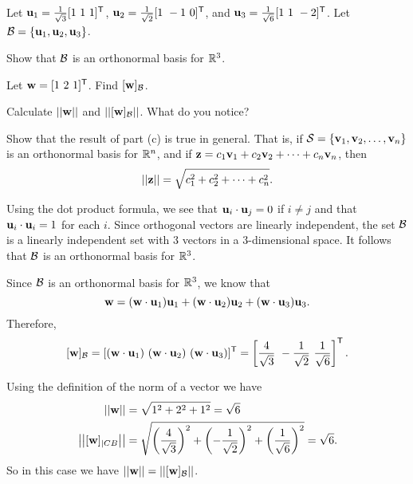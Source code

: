 \begin{example} Let $\vu_1 = \frac{1}{\sqrt{3}}[1 \ 1 \ 1]^{\tr}$, $\mathbf{u}_2 = \frac{1}{\sqrt{2}}[1 \ -1 \ 0]^{\mathsf{T}}$, and $\vu_3 = \frac{1}{\sqrt{6}}[1 \ 1 \ -2]^{\tr}$. Let $\mathcal{B} = \{\mathbf{u}_1, \mathbf{u}_2, \mathbf{u}_3\}$. 
\ba
\item Show that $\mathcal{B}$ is an orthonormal basis for $\mathbb{R}^3$. 

\item Let $\mathbf{w} = [1 \ 2 \ 1]^{\mathsf{T}}$. Find $[\mathbf{w}]_{\mathcal{B}}$. 

\item Calculate $||\mathbf{w}||$ and $\left|\left|[\mathbf{w}]_{\mathcal{B}}\right|\right|$. What do you notice?

\item Show that the result of part (c) is true in general. That is, if $\mathcal{S} = \{\mathbf{v}_1, \mathbf{v}_2, \ldots, \mathbf{v}_n\}$ is an orthonormal basis for $\mathbb{R}^n$, and if $\mathbf{z} = c_1\mathbf{v}_1 + c_2 \mathbf{v}_2 + \cdots + c_n \mathbf{v}_n$, then 
\[||\mathbf{z}|| =\sqrt{c_1^2+c_2^2 + \cdots + c_n^2}.\]

\ea


\ExampleSolution
\ba
\item Using the dot product formula, we see that $\mathbf{u}_i \cdot \mathbf{u}_j = 0$ if $i \neq j$ and that $\mathbf{u}_i \cdot \mathbf{u}_i = 1$ for each $i$. Since orthogonal vectors are linearly independent, the set $\mathcal{B}$ is a linearly independent set with $3$ vectors in a $3$-dimensional space. It follows that $\mathcal{B}$ is an orthonormal basis for $\mathbb{R}^3$. 

\item Since $\mathcal{B}$ is an orthonormal basis for $\mathbb{R}^3$, we know that
\[\mathbf{w} = (\mathbf{w} \cdot \mathbf{u}_1) \mathbf{u}_1 + (\mathbf{w} \cdot \mathbf{u}_2) \mathbf{u}_2 + (\mathbf{w} \cdot \mathbf{u}_3) \mathbf{u}_3.\]
Therefore,
\[[\vw]_{\CB} = [(\vw \cdot \vu_1) \ (\vw \cdot \vu_2) \ (\vw \cdot \vu_3)]^{\tr} = \left[ \frac{4}{\sqrt{3}} \ -\frac{1}{\sqrt{2}} \ \frac{1}{\sqrt{6}} \right]^{\tr}.\]

\item Using the definition of the norm of a vector we have
\begin{align*}
||\mathbf{w}|| &= \sqrt{1^2+2^2+1^2} = \sqrt{6} \\
\left|\left|[\mathbf{w}]_{|CB}\right|\right| &= \sqrt{\left( \frac{4}{\sqrt{3}}\right)^2+\left(-\frac{1}{\sqrt{2}}\right)^2 + \left(\frac{1}{\sqrt{6}}\right)^2} = \sqrt{6}.
\end{align*}
So in this case we have $||\mathbf{w}|| = \left|\left|[\mathbf{w}]_{\mathcal{B}}\right|\right|$. 


\end{example}
